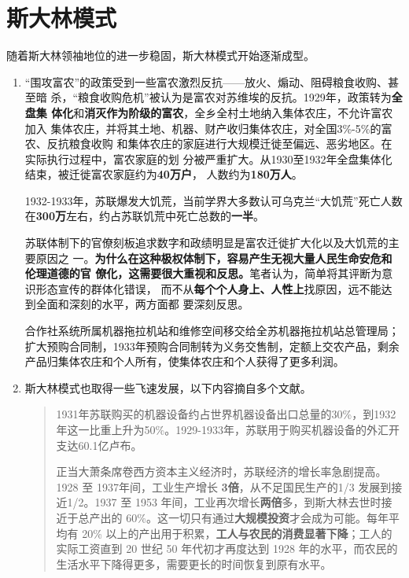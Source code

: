 \section{斯大林模式}

随着斯大林领袖地位的进一步稳固，斯大林模式开始逐渐成型。

\begin{enumerate}

\item “围攻富农”的政策受到一些富农激烈反抗——放火、煽动、阻碍粮食收购、甚至暗
  杀，“粮食收购危机”被认为是富农对苏维埃的反抗。1929年，政策转为\textbf{全盘集
    体化}和\textbf{消灭作为阶级的富农}，全乡全村土地纳入集体农庄，不允许富农加入
  集体农庄，并将其土地、机器、财产收归集体农庄，对全国3\%-5\%的富农、反抗粮食收购
  和集体农庄的家庭进行大规模迁徙至偏远、恶劣地区。在实际执行过程中，富农家庭的划
  分被严重扩大。从1930至1932年全盘集体化结束，被迁徙富农家庭约为\textbf{40万户}，
  人数约为\textbf{180万人}。\cite{xulongbinsu}

  1932-1933年，苏联爆发大饥荒，当前学界大多数认可乌克兰“大饥荒”死亡人数在\textbf{300万}左右，约占苏联饥荒中死亡总数的\textbf{一半}。\cite{wukelanjihuang}

  苏联体制下的官僚刻板追求数字和政绩明显是富农迁徙扩大化以及大饥荒的主要原因之
  一。\textbf{为什么在这种极权体制下，容易产生无视大量人民生命安危和伦理道德的官
    僚化，这需要很大重视和反思。}笔者认为，简单将其评断为意识形态宣传的群体化错误，
  而不从\textbf{每个个人身上、人性上}找原因，远不能达到全面和深刻的水平，两方面都
  要深刻反思。

  合作社系统所属机器拖拉机站和维修空间移交给全苏机器拖拉机站总管理局；扩大预购合同制，1933年预购合同制转为义务交售制，定额上交农产品，剩余产品归集体农庄和个人所有，使集体农庄和个人获得了更多利润。

\item 斯大林模式也取得一些飞速发展，以下内容摘自多个文献。

  \begin{quotation} 1931年苏联购买的机器设备约占世界机器设备出口总量的30\%，到1932年这一比重上升为50\%。1929-1933年，苏联用于购买机器设备的外汇开支达60.1亿卢布。

    正当大萧条席卷西方资本主义经济时，苏联经济的增长率急剧提高。 1928 至 1937年间，工业生产增长 \textbf{3倍}，从不足国民生产的1/3 发展到接近1/2。1937 至 1953 年间，工业再次增长\textbf{两倍}多，到斯大林去世时接近于总产出的 60\%。这一切只有通过\textbf{大规模投资}才会成为可能。每年平均有 20\% 以上的产出用于积累，\textbf{工人与农民的消费显著下降}；工人的实际工资直到 20 世纪 50 年代初才再度达到 1928 年的水平，而农民的生活水平下降得更多，需要更长的时间恢复到原有水平。


\end{quotation}
\end{enumerate}
